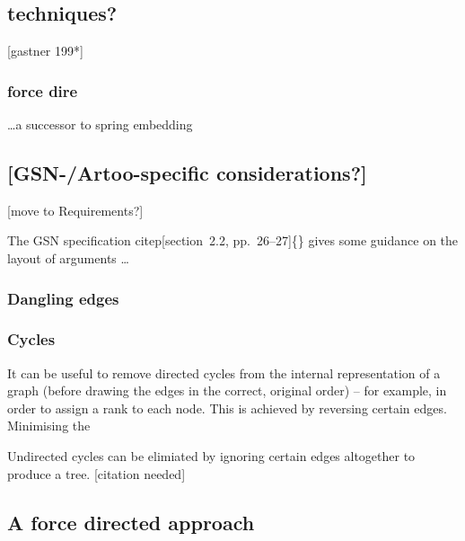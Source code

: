 \documentclass[authoryearcitations]{UoYCSproject}
\begin{document}
\section{techniques?}

[gastner 199*]

\subsection{force dire}

\ldots a successor to \citet{tutte} spring embedding

 

\section{[GSN-/Artoo-specific considerations?]}

[move to Requirements?]

The GSN specification citep[section~2.2, pp.~26--27]\{\} gives some guidance on the layout of arguments \ldots

\subsection{Dangling edges}


\subsection{Cycles}

It can be useful to remove directed cycles from the internal representation of a graph (before drawing the edges in the correct, original order) -- for example, in order to assign a rank to each node.
This is achieved by reversing certain edges. \citet{gansner1993} Minimising the 

Undirected cycles can be elimiated by ignoring certain edges altogether to produce a tree.  [citation needed]






\section{A force directed approach}



\chapter{}
\end{document}
